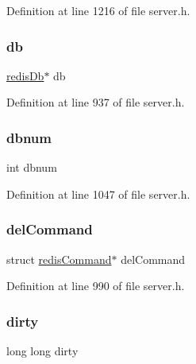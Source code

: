 Definition at line 1216 of file server.\+h.

\mbox{\label{structredis_server_a9bee04e09635a42fef289e42a89f5502}} 
\subsubsection{\texorpdfstring{db}{db}}
{\footnotesize\ttfamily \hyperlink{structredis_db}{redis\+Db}$\ast$ db}



Definition at line 937 of file server.\+h.

\mbox{\label{structredis_server_a4a23db6c6bac41afb7aee155283dbf9b}} 
\subsubsection{\texorpdfstring{dbnum}{dbnum}}
{\footnotesize\ttfamily int dbnum}



Definition at line 1047 of file server.\+h.

\mbox{\label{structredis_server_a577bbf6b03a99e785eed8ea6ebd4a665}} 
\subsubsection{\texorpdfstring{del\+Command}{delCommand}}
{\footnotesize\ttfamily struct \hyperlink{structredis_command}{redis\+Command}$\ast$ del\+Command}



Definition at line 990 of file server.\+h.

\mbox{\label{structredis_server_a7d1f8a07982c1093e48e8dcb120fcf2f}} 
\subsubsection{\texorpdfstring{dirty}{dirty}}
{\footnotesize\ttfamily long long dirty}




